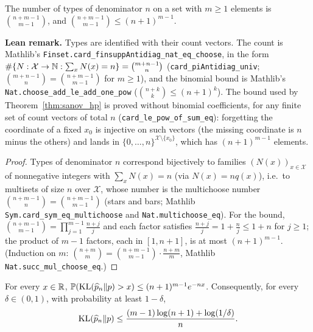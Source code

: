 \begin{lemma}\label{lem:num_types}
\leanok
The number of types of denominator $n$ on a set with $m \ge 1$ elements is
$\binom{n + m - 1}{m - 1}$, and $\binom{n + m - 1}{m - 1} \le (n + 1)^{m - 1}$.
\end{lemma}

\textbf{Lean remark.} Types are identified with their count vectors. The count is Mathlib's
\texttt{Finset.card\_finsuppAntidiag\_nat\_eq\_choose}, in the form
$\#\{N : \mathcal X \to \mathbb{N} : \sum_x N(x) = n\} = \binom{m + n - 1}{n}$ (\texttt{card\_piAntidiag\_univ};
$\binom{m + n - 1}{n} = \binom{n + m - 1}{m - 1}$ for $m \ge 1$), and the binomial bound is Mathlib's
\texttt{Nat.choose\_add\_le\_add\_one\_pow} ($\binom{n + k}{k} \le (n + 1)^k$). The bound used by
Theorem~\ref{thm:sanov_hp} is proved without binomial coefficients, for any finite set of count
vectors of total $n$ (\texttt{card\_le\_pow\_of\_sum\_eq}): forgetting the coordinate of a fixed
$x_0$ is injective on such vectors (the missing coordinate is $n$ minus the others) and lands in
$\{0, \dots, n\}^{\mathcal X \setminus \{x_0\}}$, which has $(n + 1)^{m - 1}$ elements.

\begin{proof}
\leanok
Types of denominator $n$ correspond bijectively to families $(N(x))_{x \in \mathcal X}$ of
nonnegative integers with $\sum_x N(x) = n$ (via $N(x) = n q(x)$), i.e.\ to multisets of size
$n$ over $\mathcal X$, whose number is the multichoose number $\binom{n + m - 1}{n} = \binom{n + m - 1}{m - 1}$
(stars and bars; Mathlib \texttt{Sym.card\_sym\_eq\_multichoose} and
\texttt{Nat.multichoose\_eq}). For the bound, $\binom{n + m - 1}{m - 1} = \prod_{j = 1}^{m - 1} \frac{n + j}{j}$
and each factor satisfies $\frac{n + j}{j} = 1 + \frac nj \le 1 + n$ for $j \ge 1$; the product of
$m - 1$ factors, each in $[1, n + 1]$, is at most $(n + 1)^{m - 1}$. (Induction on $m$:
$\binom{n + m}{m} = \binom{n + m - 1}{m - 1} \cdot \frac{n + m}{m}$, Mathlib
\texttt{Nat.succ\_mul\_choose\_eq}.)
\end{proof}

\begin{theorem}\label{thm:sanov_hp}
\leanok
For every $x \in \mathbb{R}$, $\mathbb{P}(\mathrm{KL}(\widehat{p}_n \| p) > x) \le (n + 1)^{m - 1} e^{-n x}$. Consequently,
for every $\delta \in (0, 1)$, with probability at least $1 - \delta$,
\[
  \mathrm{KL}(\widehat{p}_n \| p) \le \frac{(m - 1)\log(n + 1) + \log(1/\delta)}{n} .
\]
\end{theorem}

